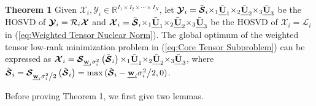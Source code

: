 \documentclass[twocolumn]{svjour3}          %
\begin{document}
    \noindent
    \textbf{Theorem 1} Given ${{\boldsymbol{\mathcal{X}}}_i},{{\boldsymbol{\mathcal{Y}}}_i} \in {\mathbb{R}^{{I_1} \times {I_2} \times  \cdots  \times {I_N}}}$, let ${{\boldsymbol{\mathcal{Y}}}_i} = {\tilde {\boldsymbol{\mathcal{S}}}_i}{ \times _1}\newline
    {\tilde{\textbf{\emph{U}}}_1}{ \times _2}{\tilde{\textbf{\emph{U}}}_2}{ \times _3}{\tilde{\textbf{\emph{U}}}_3}$ be the HOSVD of ${{\boldsymbol{\mathcal{Y}}}_i} = {{\cal R}_i}{\boldsymbol{\mathcal{X}}}$ and ${{\boldsymbol{\mathcal{X}}}_i} = {\bar {\boldsymbol{\mathcal{S}}}_i}{ \times _1}{\bar{\textbf{\emph{U}}}_1}{ \times _2}{\bar{\textbf{\emph{U}}}_2}{ \times _3}{\bar{\textbf{\emph{U}}}_3}$ be the HOSVD of ${{\boldsymbol{\mathcal{X}}}_i} = {{\boldsymbol{\mathcal{L}}}_i}$ in (\ref{eq:Weighted Tensor Nuclear Norm}). The global optimum of the weighted tensor low-rank minimization problem in (\ref{eq:Core Tensor Subproblem}) can be expressed as ${{\boldsymbol{\mathcal{X}}}_i} = {{\boldsymbol{\mathcal{S}}}_{{\textbf{\emph{w}}_i}\sigma _i^2}} \newline \left( {{{\tilde{\boldsymbol{\mathcal{S}}}}_i}} \right){ \times _1}{\tilde{\textbf{\emph{U}}}_1}{ \times _2}{\tilde{\textbf{\emph{U}}}_2}{ \times _3}{\tilde{\textbf{\emph{U}}}_3}$, where ${\hat{\boldsymbol{\mathcal{S}}}_i} = {{\boldsymbol{\mathcal{S}}}_{{{{\textbf{\emph{w}}_i}\sigma _i^2} \mathord{\left/
    {\vphantom {{{\textbf{\emph{w}}_i}\sigma _i^2} 2}} \right.
    \kern-\nulldelimiterspace} 2}}}\left( {{{\tilde{\boldsymbol{\mathcal{S}}}}_i}} \right) = \max \newline ({\tilde{\boldsymbol{\mathcal{S}}}_i} - {{{\textbf{\emph{w}}_i}\sigma _i^2} \mathord{\left/
    {\vphantom {{{\textbf{\emph{w}}_i}\sigma _i^2} 2}} \right.
    \kern-\nulldelimiterspace} 2},0)$.

    Before proving Theorem 1, we first give two lemmas.
\end{document}
